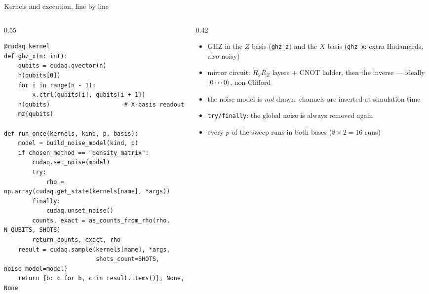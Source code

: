 \documentclass[aspectratio=169,11pt]{beamer}
\begin{document}
\begin{frame}[fragile,label=fKernels]{Kernels and execution, line by line}
  \begin{columns}[T]
    \begin{column}{0.55\textwidth}
\begin{lstlisting}[basicstyle=\ttfamily\tiny]
@cudaq.kernel
def ghz_x(n: int):
    qubits = cudaq.qvector(n)
    h(qubits[0])
    for i in range(n - 1):
        x.ctrl(qubits[i], qubits[i + 1])
    h(qubits)                     # X-basis readout
    mz(qubits)

def run_once(kernels, kind, p, basis):
    model = build_noise_model(kind, p)
    if chosen_method == "density_matrix":
        cudaq.set_noise(model)
        try:
            rho = np.array(cudaq.get_state(kernels[name], *args))
        finally:
            cudaq.unset_noise()
        counts, exact = as_counts_from_rho(rho, N_QUBITS, SHOTS)
        return counts, exact, rho
    result = cudaq.sample(kernels[name], *args,
                          shots_count=SHOTS, noise_model=model)
    return {b: c for b, c in result.items()}, None, None
\end{lstlisting}
    \end{column}
    \begin{column}{0.42\textwidth}
      \scriptsize
      \begin{itemize}\itemsep1pt
        \item GHZ in the $Z$ basis (\texttt{ghz\_z}) and the $X$ basis (\texttt{ghz\_x}: extra Hadamards, also noisy)
        \item mirror circuit: $R_Y R_Z$ layers + CNOT ladder, then the inverse --- ideally $\ket{0\cdots0}$, non-Clifford
        \item the noise model is \emph{not} drawn: channels are inserted at simulation time
        \item \texttt{try/finally}: the global noise is always removed again
        \item every $p$ of the sweep runs in both bases ($8 \times 2 = 16$ runs)
      \end{itemize}
    \end{column}
  \end{columns}
\end{frame}
\end{document}
